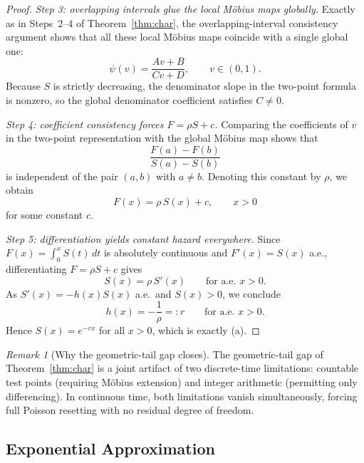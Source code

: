 \documentclass[11pt]{article}
\theoremstyle{plain}
\theoremstyle{definition}
\theoremstyle{remark}
\newtheorem{remark}[theorem]{Remark}
\begin{document}
\begin{proof}
\emph{Step 3: overlapping intervals glue the local M\"obius maps globally.}
Exactly as in Steps~2--4 of Theorem~\ref{thm:char}, the overlapping-interval
consistency argument shows that all these local M\"obius maps coincide with a
single global one:
\[
  \psi(v)=\frac{Av+B}{Cv+D},\qquad v\in(0,1).
\]
Because $S$ is strictly decreasing, the denominator slope in the two-point
formula is nonzero, so the global denominator coefficient satisfies $C\neq0$.

\emph{Step 4: coefficient consistency forces $F=\rho S + c$.}
Comparing the coefficients of $v$ in the two-point representation with the
global M\"obius map shows that
\[
  \frac{F(a)-F(b)}{S(a)-S(b)}
\]
is independent of the pair $(a,b)$ with $a\neq b$.  Denoting this constant by
$\rho$, we obtain
\[
  F(x)=\rho\,S(x)+c,\qquad x>0
\]
for some constant $c$.

\emph{Step 5: differentiation yields constant hazard everywhere.}
Since $F(x)=\int_0^x S(t)\,dt$ is absolutely continuous and
$F'(x)=S(x)$ a.e., differentiating $F=\rho S+c$ gives
\[
  S(x)=\rho\,S'(x)\qquad\text{for a.e.\ }x>0.
\]
As $S'(x)=-h(x)S(x)$ a.e.\ and $S(x)>0$, we conclude
\[
  h(x)=-\frac1\rho=:r
  \qquad\text{for a.e.\ }x>0.
\]
Hence $S(x)=e^{-rx}$ for all $x>0$, which is exactly (a).
\end{proof}



\begin{remark}[Why the geometric-tail gap closes]\label{rem:gap-closure}
The geometric-tail gap of Theorem~\ref{thm:char} is a joint artifact of two discrete-time limitations: countable test points (requiring M\"obius extension) and integer arithmetic (permitting only differencing).  In continuous time, both limitations vanish simultaneously, forcing full Poisson resetting with no residual degree of freedom.
\end{remark}






\subsection{Exponential Approximation}\label{sec:ct-exp}
\end{document}
